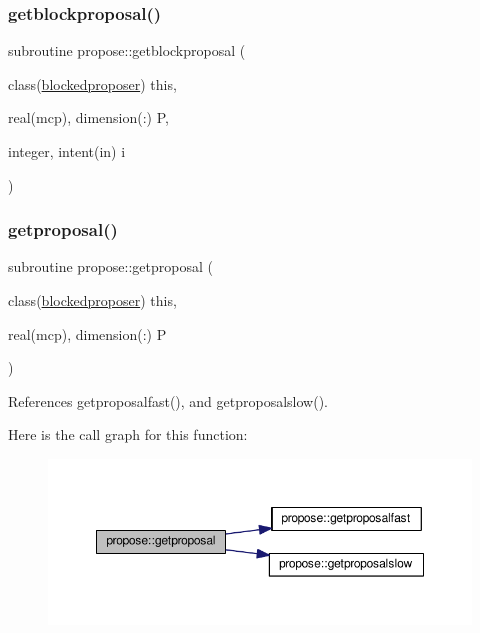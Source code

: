 \subsubsection{\texorpdfstring{getblockproposal()}{getblockproposal()}}
{\footnotesize\ttfamily subroutine propose\+::getblockproposal (\begin{DoxyParamCaption}\item[{class(\mbox{\hyperlink{structpropose_1_1blockedproposer}{blockedproposer}})}]{this,  }\item[{real(mcp), dimension(\+:)}]{P,  }\item[{integer, intent(in)}]{i }\end{DoxyParamCaption})}

\mbox{\label{namespacepropose_acc9c3d417d1630086e0f2e46eda9482c}} 
\subsubsection{\texorpdfstring{getproposal()}{getproposal()}}
{\footnotesize\ttfamily subroutine propose\+::getproposal (\begin{DoxyParamCaption}\item[{class(\mbox{\hyperlink{structpropose_1_1blockedproposer}{blockedproposer}})}]{this,  }\item[{real(mcp), dimension(\+:)}]{P }\end{DoxyParamCaption})}



References getproposalfast(), and getproposalslow().

Here is the call graph for this function\+:
\nopagebreak
\begin{figure}[H]
\begin{center}
\leavevmode
\includegraphics[width=350pt]{namespacepropose_acc9c3d417d1630086e0f2e46eda9482c_cgraph}
\end{center}
\end{figure}
\mbox{\label{namespacepropose_ac628bde62d39c32001cbd8b6a33fb2cc}} 
